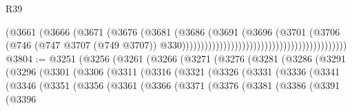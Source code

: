 \begin{lexlean}{R39}
\begin{coremodule}
                                                                      (@3661
                                                                        (@3666
                                                                          (@3671
                                                                            (@3676
                                                                              (@3681
                                                                                (@3686
                                                                                  (@3691
                                                                                    (@3696
                                                                                      (@3701
                                                                                        (@3706
                                                                                          (@746
                                                                                            (@747
                                                                                              @3707
                                                                                              (@749
                                                                                                @3707))
                                                                                            @330))))))))))))))))))))))))))))))))))))))))))))
@3804 := @3251
    (@3256
      (@3261
        (@3266
          (@3271
            (@3276
              (@3281
                (@3286
                  (@3291
                    (@3296
                      (@3301
                        (@3306
                          (@3311
                            (@3316
                              (@3321
                                (@3326
                                  (@3331
                                    (@3336
                                      (@3341
                                        (@3346
                                          (@3351
                                            (@3356
                                              (@3361
                                                (@3366
                                                  (@3371
                                                    (@3376
                                                      (@3381
                                                        (@3386
                                                          (@3391
                                                            (@3396

\end{coremodule}
\end{lexlean}
